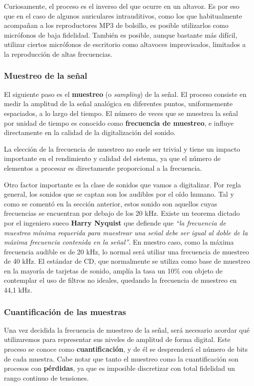 Curiosamente, el proceso es el inverso del que ocurre en un altavoz. Es por eso
que en el caso de algunos auriculares intrauditivos, como los que habitualmente
acompañan a los reproductores MP3 de bolsillo, es posible utilizarlos como
micrófonos de baja fidelidad. También es posible, aunque bastante más difícil,
utilizar ciertos micrófonos de escritorio como altavoces improvisados, limitados
a la reproducción de altas frecuencias.

\subsubsection{Muestreo de la señal}

El siguiente paso es el \textbf{muestreo} (o \textit{sampling}) de la señal. El
proceso consiste en medir la amplitud de la señal analógica en diferentes
puntos, uniformemente espaciados, a lo largo del tiempo. El número de veces que
se muestrea la señal por unidad de tiempo es conocido como \textbf{frecuencia de
  muestreo}, e influye directamente en la calidad de la digitalización del sonido.

La elección de la frecuencia de muestreo no suele ser trivial y tiene un impacto
importante en el rendimiento y calidad del sistema, ya que el número de
elementos a procesar es directamente proporcional a la frecuencia. 

Otro factor importante es la clase de sonidos que vamos a digitalizar. Por regla
general, los sonidos que se captan son los audibles por el oído humano. Tal y
como se comentó en la sección anterior, estos sonido son aquellos cuyas
frecuencias se encuentran por debajo de los 20 kHz. Existe un teorema dictado
por el ingeniero sueco \textbf{Harry Nyquist} que defiende que \textit{``la
  frecuencia de muestreo mínima requerida para muestrear una señal debe ser
  igual al doble de la máxima frecuencia contenida en la señal''}. En nuestro
caso, como la máxima frecuencia audible es de 20 kHz, lo normal será utiliar una
frecuencia de muestreo de 40 kHz. El estándar de CD, que normalmente se utiliza
como base de muestreo en la mayoría de tarjetas de sonido, amplía la tasa un
10\% con objeto de contemplar el uso de filtros no ideales, quedando la
frecuencia de muestreo en 44,1 kHz.

\subsubsection{Cuantificación de las muestras}

Una vez decidida la frecuencia de muestreo de la señal, será necesario acordar
qué utilizaremos para representar sus niveles de amplitud de forma digital. Este
proceso se conoce como \textbf{cuantificación}, y de él se desprenderá el número
de bits de cada muestra. Cabe notar que tanto el muestreo como la cuantificación
son procesos con \textbf{pérdidas}, ya que es imposible discretizar con total
fidelidad un rango continuo de tensiones.

